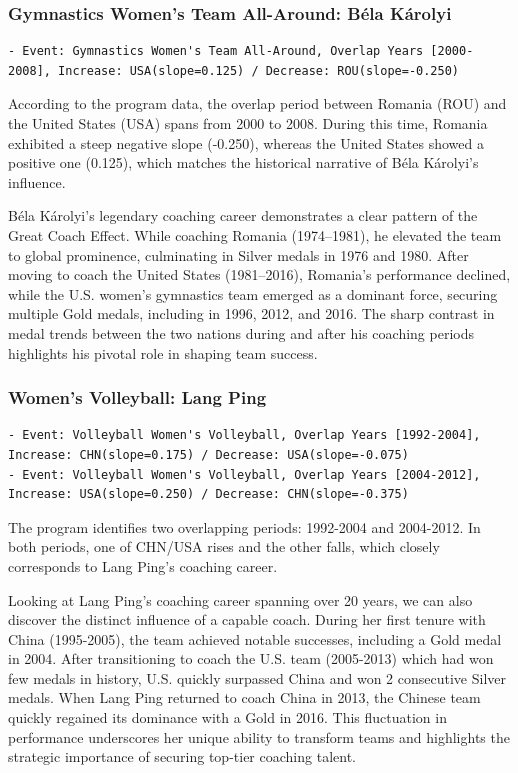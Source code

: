 \documentclass{mcmthesis}
\begin{document}
\subsubsection{Gymnastics Women's Team All-Around: Béla Károlyi}
\begin{lstlisting}
- Event: Gymnastics Women's Team All-Around, Overlap Years [2000-2008], Increase: USA(slope=0.125) / Decrease: ROU(slope=-0.250)
\end{lstlisting}

According to the program data, the overlap period between Romania (ROU) and the United States (USA) spans from 2000 to 2008. During this time, Romania exhibited a steep negative slope (-0.250), whereas the United States showed a positive one (0.125), which matches the historical narrative of Béla Károlyi's influence.

Béla Károlyi's legendary coaching career demonstrates a clear pattern of the Great Coach Effect. While coaching Romania (1974–1981), he elevated the team to global prominence, culminating in Silver medals in 1976 and 1980. After moving to coach the United States (1981–2016), Romania's performance declined, while the U.S. women's gymnastics team emerged as a dominant force, securing multiple Gold medals, including in 1996, 2012, and 2016. The sharp contrast in medal trends between the two nations during and after his coaching periods highlights his pivotal role in shaping team success.

\subsubsection{Women's Volleyball: Lang Ping}
\begin{lstlisting}
- Event: Volleyball Women's Volleyball, Overlap Years [1992-2004], Increase: CHN(slope=0.175) / Decrease: USA(slope=-0.075)
- Event: Volleyball Women's Volleyball, Overlap Years [2004-2012], Increase: USA(slope=0.250) / Decrease: CHN(slope=-0.375)
\end{lstlisting}

The program identifies two overlapping periods: 1992-2004 and 2004-2012. In both periods, one of CHN/USA rises and the other falls, which closely corresponds to Lang Ping's coaching career.

Looking at Lang Ping's coaching career spanning over 20 years, we can also discover the distinct influence of a capable coach. During her first tenure with China (1995-2005), the team achieved notable successes, including a Gold medal in 2004. After transitioning to coach the U.S. team (2005-2013) which had won few medals in history, U.S. quickly surpassed China and won 2 consecutive Silver medals. When Lang Ping returned to coach China in 2013, the Chinese team quickly regained its dominance with a Gold in 2016. This fluctuation in performance underscores her unique ability to transform teams and highlights the strategic importance of securing top-tier coaching talent.
\end{document}
